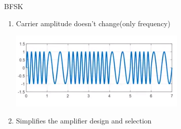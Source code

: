 \documentclass{beamer}
\begin{document}
	
	\begin{frame}{BFSK}
		\begin{flushleft}
		\begin{enumerate}
		
		    \onslide\item<1-> Carrier amplitude doesn't change(only frequency)
		
			
			\centering
			\includegraphics[scale=0.8]{7.png}
			\onslide\item<2-> Simplifies the amplifier design and selection \newline
			
		\end{enumerate}
		\end{flushleft}
	\end{frame}
	
\end{document}
